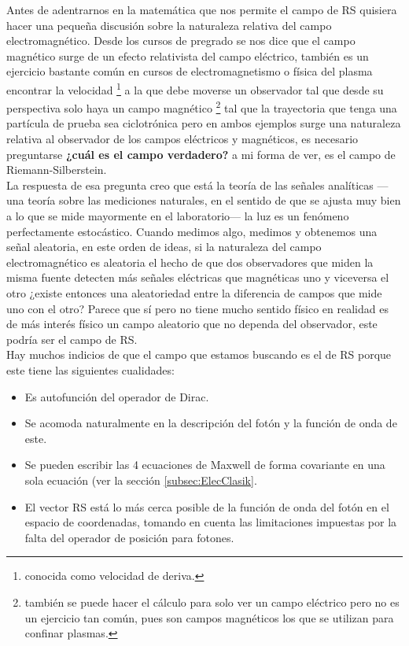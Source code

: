         Antes de adentrarnos en la matemática que nos permite el campo de RS quisiera hacer una pequeña discusión sobre la naturaleza relativa del campo electromagnético. Desde los cursos de pregrado se nos dice que el campo magnético surge de un efecto relativista del campo eléctrico, también es un ejercicio bastante común en cursos de electromagnetismo o física del plasma encontrar la velocidad \footnote{conocida como velocidad de deriva.} a la que debe moverse un observador tal que desde su perspectiva solo haya un campo magnético \footnote{también se puede hacer el cálculo para solo ver un campo eléctrico pero no es un ejercicio tan común, pues son campos magnéticos los que se utilizan para confinar plasmas.} tal que la trayectoria que tenga una partícula de prueba sea ciclotrónica pero en ambos ejemplos surge una naturaleza relativa al observador de los campos eléctricos y magnéticos, es necesario preguntarse \textbf{¿cuál es el campo verdadero?} a mi forma de ver, es el campo de Riemann-Silberstein.\\

        La respuesta de esa pregunta creo que está la teoría de las señales analíticas ---una teoría sobre las mediciones naturales, en el sentido de que se ajusta muy bien a lo que se mide mayormente en el laboratorio--- la luz es un fenómeno perfectamente estocástico. Cuando medimos algo, medimos y obtenemos una señal aleatoria, en este orden de ideas, si la naturaleza del campo electromagnético es aleatoria el hecho de que dos observadores que miden la misma fuente detecten más señales eléctricas que magnéticas uno y viceversa el otro ¿existe entonces una aleatoriedad entre la diferencia de campos que mide uno con el otro? Parece que sí pero no tiene mucho sentido físico en realidad es de más interés físico un campo aleatorio que no dependa del observador, este podría ser el campo de RS.\\

        Hay muchos indicios de que el campo que estamos buscando es el de RS porque este tiene las siguientes cualidades:

        \begin{itemize}
            \item Es autofunción del operador de Dirac.

            \item Se acomoda naturalmente en la descripción del fotón y la función de onda de este.

            \item Se pueden escribir las 4 ecuaciones de Maxwell de forma covariante en una sola ecuación (ver la sección \ref{subsec:ElecClasik}.

            \item El vector RS está lo más cerca posible de la función de onda del fotón en el espacio de coordenadas, tomando en cuenta las limitaciones impuestas por la falta del operador de posición para fotones.
        \end{itemize}

